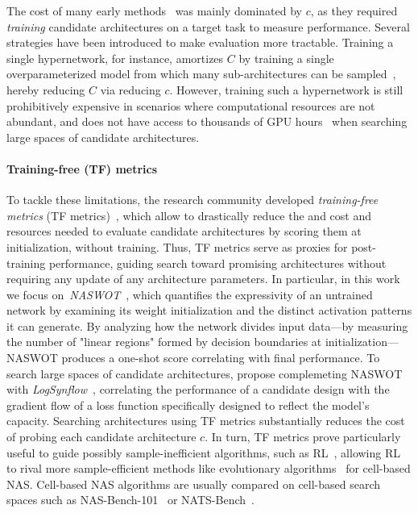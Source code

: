 The cost of many early methods~\citep{zoph2016neural,baker2016designing,real2017large} was mainly dominated by \( c \), as they required \emph{training} candidate architectures on a target task to measure performance. Several strategies have been introduced to make evaluation more tractable. 
Training a single hypernetwork, for instance, amortizes \(C \) by training a single overparameterized model from which many sub-architectures can be sampled~\citep{brock2017smash, pham2018efficient,cai2019once}, hereby reducing \(C \) via reducing \( c \). However, training such a hypernetwork is still prohibitively expensive in scenarios where computational resources are not abundant, and does not have access to thousands of GPU hours~\citep{cai2019once} when searching large spaces of candidate architectures.

\paragraph{Training-free (TF) metrics}
To tackle these limitations, the research community developed \emph{training-free metrics} (TF metrics)~\citep{mellor2021neural,jacot2018neural,chen2021neural,chen2023understanding}, which allow to drastically reduce the and cost and resources needed to evaluate candidate architectures by scoring them at initialization, without training.
Thus, TF metrics serve as proxies for post-training performance, guiding search toward promising architectures without requiring any update of any architecture parameters. In particular, in this work we focus on~\emph{NASWOT}~\citep{mellor2021neural}, which quantifies the expressivity of an untrained network by examining its weight initialization and the distinct activation patterns it can generate. By analyzing how the network divides input data---by measuring the number of "linear regions" formed by decision boundaries at initialization---NASWOT produces a one-shot score correlating with final performance.
To search large spaces of candidate architectures, \citet{cavagnero2023freerea} propose complemeting NASWOT with \emph{LogSynflow}~\citep{cavagnero2023freerea, tanaka2020pruning}, correlating the performance of a candidate design with the gradient flow of a loss function specifically designed to reflect the model's capacity.
Searching architectures using TF metrics substantially reduces the cost of probing each candidate architecture \( c \). In turn, TF metrics prove particularly useful to guide possibly sample-inefficient algorithms, such as RL~\citep{zoph2016neural}, allowing RL to rival more sample-efficient methods like evolutionary algorithms~\citep{real2017large} for cell-based NAS.
Cell-based NAS algorithms are usually compared on cell-based search spaces such as NAS-Bench-101~\citep{ying2019bench} or NATS-Bench~\citep{dong2021nats}.


